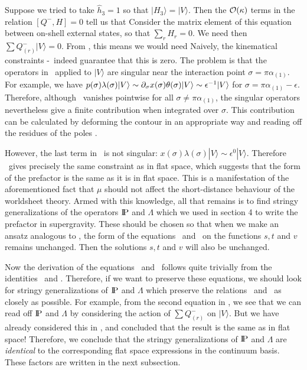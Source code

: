 Suppose
we tried to take $\hat{h}_3 = 1$ so that $|H_3\rangle = |V\rangle$.
Then the ${\cal{O}}(\kappa)$ terms in the relation
$[ Q^-, H] = 0$
tell us that
\eqn{}
Consider the matrix element of this equation between on-shell
external states, so that $\sum_r H_r = 0$.
We need then $\sum Q^-_{(r)} |V \rangle = 0$.  From
\qminus, this means
we would need
\eqn{}
Naively, the kinematical constraints \breqone-\freqtwo\ indeed guarantee
that this is zero.
The problem is that the operators in \sing\ applied
to $|V\rangle$ are singular near the
interaction point $\sigma = \pi \alpha_{(1)}$.  For example,
we have $p(\sigma) \lambda(\sigma) |V \rangle
\sim \partial_\sigma x(\sigma)\theta(\sigma) |V \rangle
\sim \epsilon^{-1} |V\rangle$ for $\sigma
= \pi \alpha_{(1)}-\epsilon$.  Therefore, although \sing\ vanishes
pointwise
for all $\sigma \ne \pi \alpha_{(1)}$, the singular operators
nevertheless give
a finite contribution when integrated over $\sigma$.  This
contribution can be calculated by deforming the contour in an appropriate
way and reading off the residues of the poles \GSW.

However, the last term in \sing\ is not singular:
$x(\sigma) \lambda(\sigma)|V\rangle \sim \epsilon^0 |V\rangle$.
Therefore \sing\ gives precisely the same constraint as in
flat space, which suggests
that the form of the prefactor is the same
as it is in flat space.
This is a manifestation of the aforementioned fact that
$\mu$ should not affect the short-distance behaviour of the
worldsheet theory.
Armed with this knowledge,
all that remains is to find stringy
generalizations of the operators $\relax{\rm I\kern-.18em P}$ and $\Lambda$ which we
used in section 4 to write the prefactor in supergravity.
These should be chosen so that when we
make an ansatz analogous to \ansatz, the form of the
equations \eqone\ and \eqtwo\ on the functions
$s,t$ and $v$ remains unchanged.
Then the solutions $s, t$ and $v$ will also be
unchanged.


Now the derivation of the equations \eqone\ and \eqtwo\ follows
quite trivially from the identities \useful\ and \vacact.
Therefore, if we want to preserve these equations, we should
look for stringy generalizations of $\relax{\rm I\kern-.18em P}$ and $\Lambda$
which preserve the relations \useful\ and \vacact\ as closely
as possible.
For example, from the second equation in \vacact, we see that
we can read off $\relax{\rm I\kern-.18em P}$ and $\Lambda$ by considering the action
of $\sum Q^-_{(r)}$ on $|V\rangle$.
But we have already considered this in \sing, and concluded that
the result is the same as in flat space!
Therefore, we conclude that the stringy generalizations of
$\relax{\rm I\kern-.18em P}$ and $\Lambda$ are {\it identical} to the corresponding
flat space expressions in the continuum basis.
These factors are written in the next subsection.


